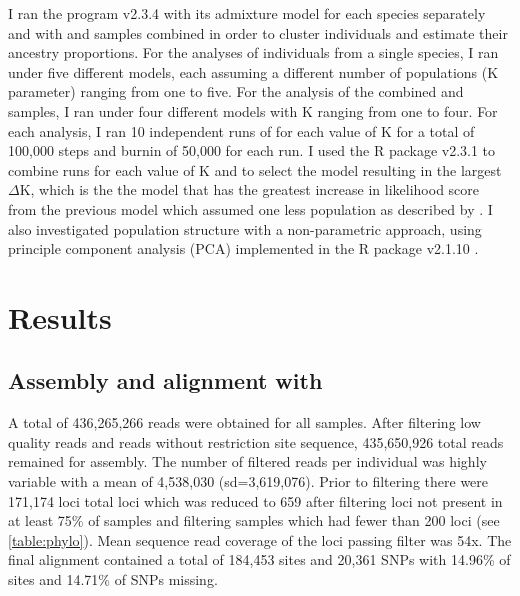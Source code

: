 I ran the program \structure v2.3.4 \parencite{pritchard2000} with its admixture 
model for each species separately and with \fowl and \wood samples combined 
in order to cluster individuals and estimate their ancestry proportions. 
For the \structure analyses of individuals from a single species, I ran \structure
under five different models, each assuming a different number of populations
(K parameter) ranging from one to five. 
For the \structure analysis of the combined \fowl and \wood samples, I ran 
\structure under four different models with K ranging from one to four.
For each analysis, I ran 10 independent runs of \structure for each value of K for a total of 100,000
steps and burnin of 50,000 for each run.
I used the R package \pophelper v2.3.1 \parencite{francis2017} to combine
runs for each value of K and to select the model resulting in the largest
$\Delta$K, which is the the model that has the greatest increase in likelihood 
score from the previous model which assumed one less population as described by \parencite{evanno2005}.
I also investigated population structure with a non-parametric approach, using
principle component analysis (PCA) implemented in the R package
\adegenet v2.1.10 \parencite{jombart2008}. 

\section{Results}

\subsection{Assembly and alignment with \pyrad}
A total of 436,265,266 reads were obtained for all samples. After filtering low
quality reads and reads without restriction site sequence, 435,650,926 total reads 
remained for assembly.
The number of filtered reads per individual was highly variable with a mean of 
4,538,030 (sd=3,619,076).
Prior to filtering there were 171,174 loci total loci which was reduced to  
659 after filtering loci not present in at least 75\% of samples and filtering
samples which had fewer than 200 loci (see \cref{table:phylo}).
Mean sequence read coverage of the loci passing filter was 54x.
The final alignment contained a total of 184,453 sites and 20,361 SNPs with 
14.96\% of sites and 14.71\% of SNPs missing.

